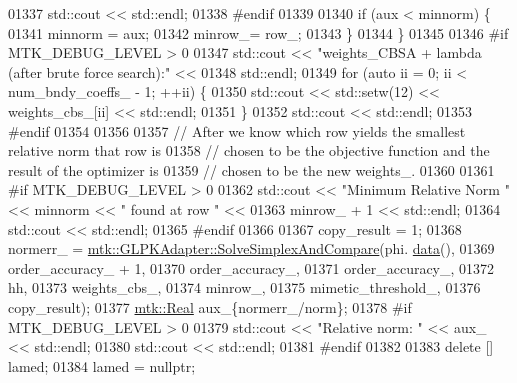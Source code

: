 \begin{DoxyCode}
{{01337       std::cout << std::endl;
01338 \textcolor{preprocessor}{      #endif}
01339 
01340       \textcolor{keywordflow}{if} (aux < minnorm) \{
01341         minnorm = aux;
01342         minrow\_= row\_;
01343       \}
01344     \}
01345 
01346 \textcolor{preprocessor}{    #if MTK\_DEBUG\_LEVEL > 0}
01347     std::cout << \textcolor{stringliteral}{"weights\_CBSA + lambda (after brute force search):"} <<
01348       std::endl;
01349     \textcolor{keywordflow}{for} (\textcolor{keyword}{auto} ii = 0; ii < num\_bndy\_coeffs\_ - 1; ++ii) \{
01350       std::cout << std::setw(12) << weights\_cbs\_[ii] << std::endl;
01351     \}
01352     std::cout << std::endl;
01353 \textcolor{preprocessor}{    #endif}
01354 
01356 
01357     \textcolor{comment}{// After we know which row yields the smallest relative norm that row is}
01358     \textcolor{comment}{// chosen to be the objective function and the result of the optimizer is}
01359     \textcolor{comment}{// chosen to be the new weights\_.}
01360 
01361 \textcolor{preprocessor}{    #if MTK\_DEBUG\_LEVEL > 0}
01362     std::cout << \textcolor{stringliteral}{"Minimum Relative Norm "} << minnorm << \textcolor{stringliteral}{" found at row "} <<
01363       minrow\_ + 1 << std::endl;
01364     std::cout << std::endl;
01365 \textcolor{preprocessor}{    #endif}
01366 
01367     copy\_result = 1;
01368     normerr\_ = \hyperlink{classmtk_1_1GLPKAdapter_a834480aca83e3c0d09fdab7fdb7e8a3f}{mtk::GLPKAdapter::SolveSimplexAndCompare}(phi.
      \hyperlink{classmtk_1_1DenseMatrix_a0c33b8a9e01d157c61ddbdf807c25d84}{data}(),
01369                                                         order\_accuracy\_ + 1,
01370                                                         order\_accuracy\_,
01371                                                         order\_accuracy\_,
01372                                                         hh,
01373                                                         weights\_cbs\_,
01374                                                         minrow\_,
01375                                                         mimetic\_threshold\_,
01376                                                         copy\_result);
01377     \hyperlink{group__c01-roots_gac080bbbf5cbb5502c9f00405f894857d}{mtk::Real} aux\_\{normerr\_/norm\};
01378 \textcolor{preprocessor}{    #if MTK\_DEBUG\_LEVEL > 0}
01379     std::cout << \textcolor{stringliteral}{"Relative norm: "} << aux\_ << std::endl;
01380     std::cout << std::endl;
01381 \textcolor{preprocessor}{    #endif}
01382 
01383     \textcolor{keyword}{delete} [] lamed;
01384     lamed = \textcolor{keyword}{nullptr};
}}
\end{DoxyCode}
